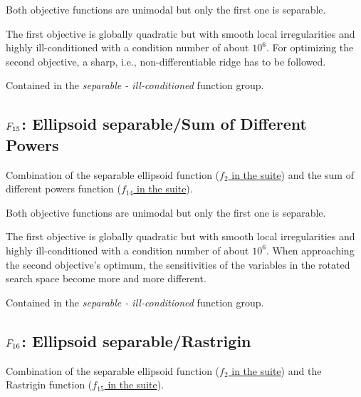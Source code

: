 Both objective functions are unimodal but only the first one is
separable.

The first objective is globally quadratic but with smooth local
irregularities and highly ill-conditioned with a condition number of
about \(10^6\). For optimizing the second objective, a sharp,
i.e., non-differentiable ridge has to be followed.

Contained in the \emph{separable - ill-conditioned} function group.



\subsection[\texorpdfstring{\protect\(F_{15}\protect\): Ellipsoid separable/Sum of Different Powers}{F15: Ellipsoid separable/Sum of Different Powers}]{\texorpdfstring{\protect\(F_{15}\protect\): Ellipsoid separable/Sum of Different Powers}{}}
\label{index:ellipsoid-separable-sum-of-different-powers}\label{index:f15}
Combination of the separable ellipsoid function (\href{https://coco.gforge.inria.fr/downloads/download16.00/bbobdocfunctions.pdf\#page=10}{\(f_2\) in the \bbob suite}) and the sum of different powers function
(\href{https://coco.gforge.inria.fr/downloads/download16.00/bbobdocfunctions.pdf\#page=70}{\(f_{14}\) in the \bbob suite}).

Both objective functions are unimodal but only the first one is
separable.

The first objective is globally quadratic but with smooth local
irregularities and highly ill-conditioned with a condition number of
about \(10^6\). When approaching the second objective's optimum,
the sensitivities of the variables in the rotated search space become
more and more different.

Contained in the \emph{separable - ill-conditioned} function group.



\subsection[\texorpdfstring{\protect\(F_{16}\protect\): Ellipsoid separable/Rastrigin}{F16: Ellipsoid separable/Rastrigin}]{\texorpdfstring{\protect\(F_{16}\protect\): Ellipsoid separable/Rastrigin}{}}
\label{index:ellipsoid-separable-rastrigin}\label{index:f16}
Combination of the separable ellipsoid function (\href{https://coco.gforge.inria.fr/downloads/download16.00/bbobdocfunctions.pdf\#page=10}{\(f_2\) in the \bbob suite}) and the Rastrigin function (\href{https://coco.gforge.inria.fr/downloads/download16.00/bbobdocfunctions.pdf\#page=75}{\(f_{15}\) in the \bbob suite}).

